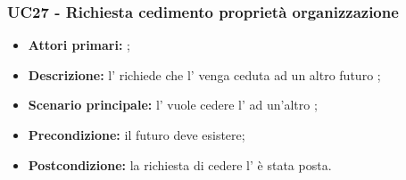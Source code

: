 \documentclass[casi-duso]{subfiles}
\begin{document}
\subsubsection{UC27 - Richiesta cedimento proprietà organizzazione}
\label{subsub:UC27}
\begin{itemize}
  \item \textbf{Attori primari:} ;
  \item \textbf{\textbf{Descrizione:}} l'  richiede che l' venga ceduta ad un altro futuro ;
  \item \textbf{\textbf{Scenario principale:}} l'  vuole cedere l' ad un'altro ;
  \item \textbf{Precondizione:} il futuro  deve esistere;
  \item \textbf{Postcondizione:} la richiesta di cedere l' è stata posta.
\end{itemize}

\end{document}
